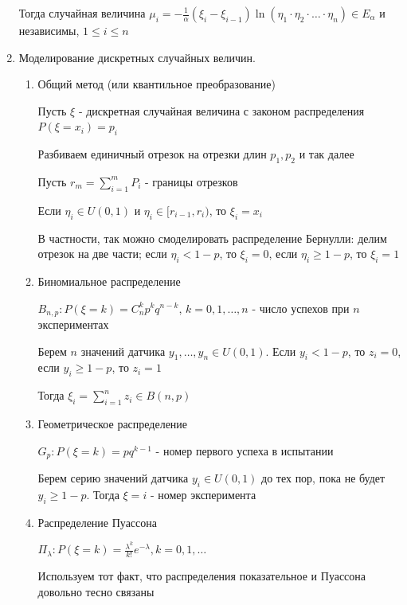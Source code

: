 \begin{enumerate}
\begin{MyTheorem}
        Тогда случайная величина $\mu_i = -\frac{1}{\alpha}(\xi_i - \xi_{i - 1}) \ln (\eta_1 \cdot \eta_2 \cdot \dots \cdot \eta_n) \in E_\alpha$ и независимы, $1 \leq i \leq n$
    \end{MyTheorem}

    \item Моделирование дискретных случайных величин.

    \begin{enumerate}[label*=\Roman*. ]
        \item Общий метод (или квантильное преобразование)

        Пусть $\xi$ - дискретная случайная величина с законом распределения $P(\xi = x_i) = p_i$

        Разбиваем единичный отрезок на отрезки длин $p_1, p_2$ и так далее

        Пусть $r_m = \sum_{i = 1}^m P_i$ - границы отрезков

        Если $\eta_i \in U(0, 1)$ и $\eta_i \in [r_{i-1}, r_{i})$, то $\xi_i = x_i$

        В частности, так можно смоделировать распределение Бернулли: делим отрезок на две части; если $\eta_i < 1 - p$, то $\xi_i = 0$, если $\eta_i \geq 1 - p$, то $\xi_i = 1$

        \item Биномиальное распределение

        $B_{n,p}: P(\xi = k) = C_n^k p^k q^{n - k}$, $k = 0, 1, \dots, n$ - число успехов при $n$ экспериментах
        
        Берем $n$ значений датчика $y_1, \dots, y_n \in U(0, 1)$. Если $y_i < 1 - p$, то $z_i = 0$, если $y_i \geq 1 - p$, то $z_i = 1$

        Тогда $\xi_i = \sum_{i = 1}^n z_i \in B(n, p)$

        \item Геометрическое распределение

        $G_p: P(\xi = k) = p q^{k - 1}$ - номер первого успеха в испытании

        Берем серию значений датчика $y_i \in U(0, 1)$ до тех пор, пока не будет $y_i \geq 1 - p$. Тогда $\xi = i$ - номер эксперимента

        \item Распределение Пуассона

        $\Pi_\lambda: P(\xi = k) = \frac{\lambda^k}{k!} e^{-\lambda}, k = 0, 1, \dots$

        Используем тот факт, что распределения показательное и Пуассона довольно тесно связаны


\end{enumerate}
\end{enumerate}
